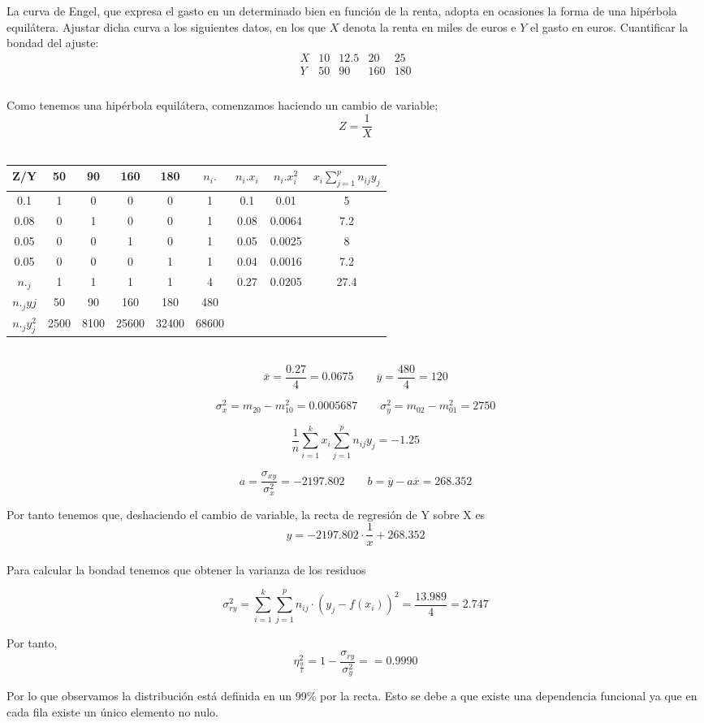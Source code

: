 \problem

La curva de Engel, que expresa el gasto en un determinado bien en funci\'on de la renta,
adopta en ocasiones la forma de una hip\'erbola equil\'atera. Ajustar dicha curva a los siguientes
datos, en los que $X$ denota la renta en miles de euros e $Y$ el gasto en euros. Cuantificar la
bondad del ajuste:$$
    \begin{array}{c|cccc}
      X &  10  & 12\mbox{.}5 &  20  & 25 \\ \hline
      Y &  50  &  90  &  160 & 180  \\
    \end{array}
$$ \\


Como tenemos una hipérbola equilátera, comenzamos haciendo un cambio de variable; $$Z = \dfrac{1}{X}$$ \\


\begin{tabular}{|c|c c c c|c|c|c|c|}
    \hline
    Z/Y  & 50 & 90 & 160 & 180 & $n_i.$ & $n_i.x_i$ & $n_i.x_i^2$ & $x_i\sum_{j=1}^p n_{ij} y_j$ \\ \hline
    0.1  & 1 & 0 & 0 & 0 & 1 & 0.1 & 0.01 & 5\\ 
    0.08 & 0 & 1 & 0 & 0 & 1 & 0.08 & 0.0064 & 7.2\\
    0.05 & 0 & 0 & 1 & 0 & 1 & 0.05 & 0.0025 & 8\\
    0.05 & 0 & 0 & 0 & 1 & 1 & 0.04 & 0.0016 & 7.2 \\ \hline
    $n._j$ & 1 & 1 & 1 & 1 & 4 & 0.27 & 0.0205 & 27.4 \\ \hline
    $n._jyj$ & 50 & 90 & 160 & 180 & 480 & & & \\ \hline
    $n._jy_j^2$ & 2500 &  8100 & 25600 & 32400 & 68600 & & & \\ \hline
\end{tabular}
\\


$$\overline{x} = \dfrac{0.27}{4} = 0.0675 \qquad \overline{y} = \dfrac{480}{4} = 120 $$

$$ \sigma_x^2 = m_{20} - m_{10}^2= 0.0005687 \qquad \sigma_y^2 = m_{02} - m_{01}^2= 2750 $$ 

$$\dfrac{1}{n}\sum_{i=1}^k x_i\sum_{j=1}^p n_{ij} y_j = -1.25$$

$$a = \dfrac{\sigma_{xy}}{\sigma_x^2} = -2197.802 \qquad b = \overline{y} - a\overline{x} = 268.352$$

Por tanto tenemos que, deshaciendo el cambio de variable, la recta de regresión de Y sobre X es $$y = -2197.802\cdot\dfrac{1}{x} + 268.352$$ \\

Para calcular la bondad tenemos que obtener la varianza de los residuos

$$\sigma_{ry}^2 = \sum_{i=1}^{k}\sum_{j=1}^p n_{ij}\cdot(y_j-f(x_i))^2 = \dfrac{13.989}{4} = 2.747 $$

Por tanto, 
$$\eta_{\frac{y}{x}}^2 = 1 - \dfrac{\sigma_{ry}}{\sigma_y^2} = = 0.9990$$


Por lo que observamos la distribución está definida en un 99\% por la recta. Esto se debe a que existe una dependencia funcional ya que en cada fila existe un único elemento no nulo. 
